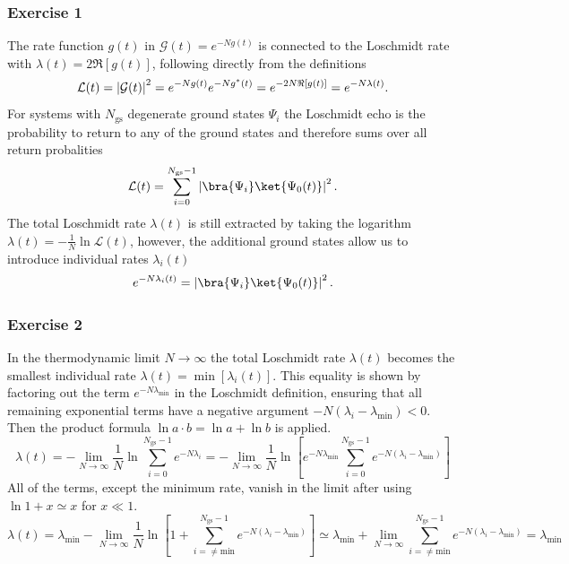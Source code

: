 \subsubsection{Exercise 1}
The rate function $g(t)$ in $\mathcal{G}(t) = e^{-Ng(t)}$ is connected to the Loschmidt rate with $\lambda(t) = 2\Re{[g(t)]}$, following directly from the definitions
\begin{equation}
    \mathcal{L}(t) = \left|\mathcal{G}(t)\right|^2 = e^{-Ng(t)}e^{-Ng^*(t)} = e^{-2N\Re{[g(t)]}} = e^{-N\lambda(t)}.
\end{equation}
For systems with $N_\mathrm{gs}$ degenerate ground states $\Psi_i$ the Loschmidt echo is the probability to return to any of the ground states and therefore sums over all return probalities
\begin{equation}
    \mathcal{L}(t) = \sum^{N_\mathrm{gs}-1}_{i=0}\left|\bra{\Psi_i}\ket{\Psi_0(t)}\right|^2.
\end{equation}
The total Loschmidt rate $\lambda(t)$ is still extracted by taking the logarithm $\lambda(t) = - \frac{1}{N}\ln\mathcal{L}(t)$, however, the additional ground states allow us to introduce individual rates $\lambda_i(t)$
\begin{equation}
    e^{-N\lambda_i(t)} = \left|\bra{\Psi_i}\ket{\Psi_0(t)}\right|^2.
\end{equation}
\subsubsection{Exercise 2}
In the thermodynamic limit $N \to \infty$ the total Loschmidt rate $\lambda(t)$ becomes the smallest individual rate $\lambda(t) = \operatorname{min}[\lambda_i(t)]$. This equality is shown by factoring out the term $e^{-N\lambda_\mathrm{min}}$ in the Loschmidt definition, ensuring that all remaining exponential terms have a negative argument $-N(\lambda_i - \lambda_\mathrm{min}) < 0$. Then the product formula $\ln a\cdot b = \ln a + \ln b$ is applied.
\begin{equation*}
    \lambda(t) = - \lim_{N\to\infty}\frac{1}{N}\ln \sum^{N_\mathrm{gs}-1}_{i=0}e^{-N\lambda_i} = - \lim_{N\to\infty}\frac{1}{N}\ln \left[e^{-N\lambda_\mathrm{min}}\sum^{N_\mathrm{gs}-1}_{i=0}e^{-N(\lambda_i-\lambda_\mathrm{min})}\right]
\end{equation*}
 All of the terms, except the minimum rate, vanish in the limit after using $\ln 1 + x \simeq x$ for $x \ll 1$.
 \begin{equation*}
    \lambda(t) = \lambda_\mathrm{min} - \lim_{N\to\infty}\frac{1}{N}\ln\left[1 + \sum^{N_\mathrm{gs}-1}_{i=\neq\mathrm{min}}e^{-N(\lambda_i-\lambda_\mathrm{min})}\right] \simeq \lambda_\mathrm{min} + \lim_{N\to\infty} \sum^{N_\mathrm{gs}-1}_{i=\neq\mathrm{min}} e^{-N(\lambda_i - \lambda_\mathrm{min})} = \lambda_\mathrm{min}
 \end{equation*}
